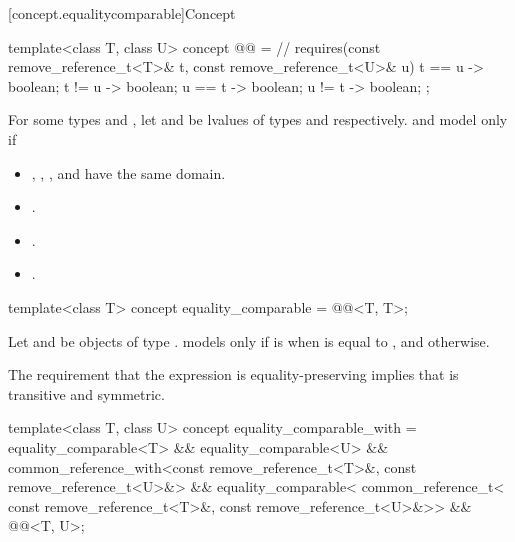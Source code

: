 [concept.equalitycomparable]{Concept }

\begin{itemdecl}
template<class T, class U>
  concept @@ = // \expos
    requires(const remove_reference_t<T>& t,
             const remove_reference_t<U>& u) {
      { t == u } -> boolean;
      { t != u } -> boolean;
      { u == t } -> boolean;
      { u != t } -> boolean;
    };
\end{itemdecl}

\begin{itemdescr}
\pnum
For some types  and ,
let  and  be lvalues of types
 and
 respectively.
 and  model
 only if
\begin{itemize}
\item {}, , , and 
      have the same domain.
\item {}.
\item {}.
\item {}.
\end{itemize}
\end{itemdescr}

%
\begin{itemdecl}
template<class T>
  concept equality_comparable = @@<T, T>;
\end{itemdecl}

\begin{itemdescr}
\pnum
Let  and  be objects of type .
 models  only if
 is  when  is equal to
, and  otherwise.

\pnum
\begin{note}
The requirement that the expression  is equality-preserving
implies that \tcode{==} is transitive and symmetric.
\end{note}
\end{itemdescr}

%
\begin{itemdecl}
template<class T, class U>
  concept equality_comparable_with =
    equality_comparable<T> && equality_comparable<U> &&
    common_reference_with<const remove_reference_t<T>&, const remove_reference_t<U>&> &&
    equality_comparable<
      common_reference_t<
        const remove_reference_t<T>&,
        const remove_reference_t<U>&>> &&
    @@<T, U>;
\end{itemdecl}

